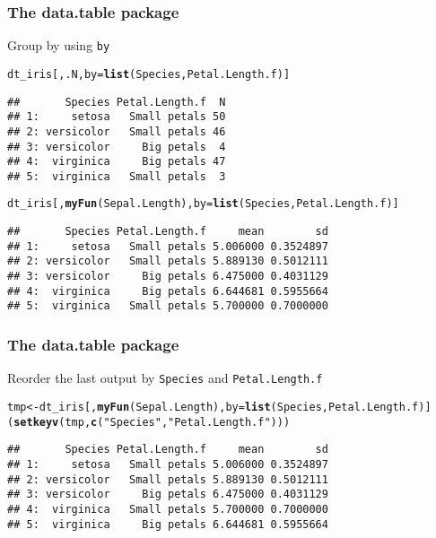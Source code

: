 \documentclass[paper=screen,mathserif]{beamer}\usepackage[]{graphicx}\usepackage[]{color}
\makeatletter
\newcommand{\hlstr}[1]{\textcolor[rgb]{0.192,0.494,0.8}{#1}}%
\newcommand{\hlstd}[1]{\textcolor[rgb]{0.345,0.345,0.345}{#1}}%
\newcommand{\hlkwb}[1]{\textcolor[rgb]{0.69,0.353,0.396}{#1}}%
\newcommand{\hlkwc}[1]{\textcolor[rgb]{0.333,0.667,0.333}{#1}}%
\newcommand{\hlkwd}[1]{\textcolor[rgb]{0.737,0.353,0.396}{\textbf{#1}}}%
\newenvironment{kframe}{%
 \def\at@end@of@kframe{}%
 \ifinner\ifhmode%
  \def\at@end@of@kframe{\end{minipage}}%
  \begin{minipage}{\columnwidth}%
 \fi\fi%
 \def\FrameCommand##1{\hskip\@totalleftmargin \hskip-\fboxsep
 \colorbox{shadecolor}{##1}\hskip-\fboxsep
     \hskip-\linewidth \hskip-\@totalleftmargin \hskip\columnwidth}%
 \MakeFramed {\advance\hsize-\width
   \@totalleftmargin\z@ \linewidth\hsize
   \@setminipage}}%
 {\par\unskip\endMakeFramed%
 \at@end@of@kframe}
\newenvironment{knitrout}{}{} %
\newcommand{\ft}[1]{\frametitle{#1}}
\makeatother
\begin{document}
\begin{frame}[fragile]
  \ft{The {\bf data.table} package}
  
  Group by using {\tt by}
\begin{knitrout}\scriptsize
{}\color{fgcolor}\begin{kframe}
\begin{alltt}
\hlstd{dt_iris[, .N,} \hlkwc{by} \hlstd{=} \hlkwd{list}\hlstd{(Species, Petal.Length.f)]}
\end{alltt}
\begin{verbatim}
##       Species Petal.Length.f  N
## 1:     setosa   Small petals 50
## 2: versicolor   Small petals 46
## 3: versicolor     Big petals  4
## 4:  virginica     Big petals 47
## 5:  virginica   Small petals  3
\end{verbatim}
\begin{alltt}
\hlstd{dt_iris[,} \hlkwd{myFun}\hlstd{(Sepal.Length),} \hlkwc{by} \hlstd{=} \hlkwd{list}\hlstd{(Species, Petal.Length.f)]}
\end{alltt}
\begin{verbatim}
##       Species Petal.Length.f     mean        sd
## 1:     setosa   Small petals 5.006000 0.3524897
## 2: versicolor   Small petals 5.889130 0.5012111
## 3: versicolor     Big petals 6.475000 0.4031129
## 4:  virginica     Big petals 6.644681 0.5955664
## 5:  virginica   Small petals 5.700000 0.7000000
\end{verbatim}
\end{kframe}
\end{knitrout}

\end{frame}

\begin{frame}[fragile]
  \ft{The {\bf data.table} package}

  Reorder the last output by {\tt Species} and {\tt Petal.Length.f}

\begin{knitrout}\scriptsize
{}\color{fgcolor}\begin{kframe}
\begin{alltt}
\hlstd{tmp} \hlkwb{<-} \hlstd{dt_iris[,} \hlkwd{myFun}\hlstd{(Sepal.Length),} \hlkwc{by} \hlstd{=} \hlkwd{list}\hlstd{(Species, Petal.Length.f)]}
\hlstd{(}\hlkwd{setkeyv}\hlstd{(tmp,} \hlkwd{c}\hlstd{(}\hlstr{"Species"}\hlstd{,} \hlstr{"Petal.Length.f"}\hlstd{)))}
\end{alltt}
\begin{verbatim}
##       Species Petal.Length.f     mean        sd
## 1:     setosa   Small petals 5.006000 0.3524897
## 2: versicolor   Small petals 5.889130 0.5012111
## 3: versicolor     Big petals 6.475000 0.4031129
## 4:  virginica   Small petals 5.700000 0.7000000
## 5:  virginica     Big petals 6.644681 0.5955664
\end{verbatim}
\end{kframe}
\end{knitrout}
\end{frame}
\end{document}
